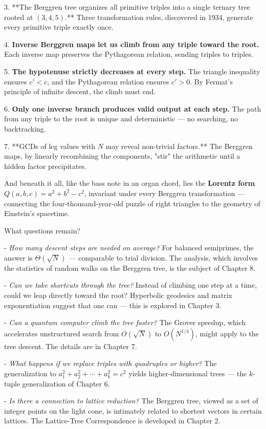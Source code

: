 \documentclass[12pt, letterpaper, openany]{book}
\theoremstyle{definition}
\theoremstyle{remark}
\begin{document}
3. **The Berggren tree organizes all primitive triples into a single ternary tree rooted at $(3,4,5)$.** Three transformation rules, discovered in 1934, generate every primitive triple exactly once.

4. \textbf{Inverse Berggren maps let us climb from any triple toward the root.} Each inverse map preserves the Pythagorean relation, sending triples to triples.

5. \textbf{The hypotenuse strictly decreases at every step.} The triangle inequality ensures $c' < c$, and the Pythagorean relation ensures $c' > 0$. By Fermat's principle of infinite descent, the climb must end.

6. \textbf{Only one inverse branch produces valid output at each step.} The path from any triple to the root is unique and deterministic --- no searching, no backtracking.

7. **GCDs of leg values with $N$ may reveal non-trivial factors.** The Berggren maps, by linearly recombining the components, "stir" the arithmetic until a hidden factor precipitates.

And beneath it all, like the bass note in an organ chord, lies the \textbf{Lorentz form} $Q(a,b,c) = a^2 + b^2 - c^2$, invariant under every Berggren transformation --- connecting the four-thousand-year-old puzzle of right triangles to the geometry of Einstein's spacetime.

What questions remain?

- \textit{How many descent steps are needed on average?} For balanced semiprimes, the answer is $\Theta(\sqrt{N})$ --- comparable to trial division. The analysis, which involves the statistics of random walks on the Berggren tree, is the subject of Chapter 8.

- \textit{Can we take shortcuts through the tree?} Instead of climbing one step at a time, could we leap directly toward the root? Hyperbolic geodesics and matrix exponentiation suggest that one can --- this is explored in Chapter 3.

- \textit{Can a quantum computer climb the tree faster?} The Grover speedup, which accelerates unstructured search from $O(\sqrt{N})$ to $O(N^{1/4})$, might apply to the tree descent. The details are in Chapter 7.

- \textit{What happens if we replace triples with quadruples or higher?} The generalization to $a_1^2 + a_2^2 + \cdots + a_k^2 = c^2$ yields higher-dimensional trees --- the $k$-tuple generalization of Chapter 6.

- \textit{Is there a connection to lattice reduction?} The Berggren tree, viewed as a set of integer points on the light cone, is intimately related to shortest vectors in certain lattices. The Lattice-Tree Correspondence is developed in Chapter 2.
\end{document}
